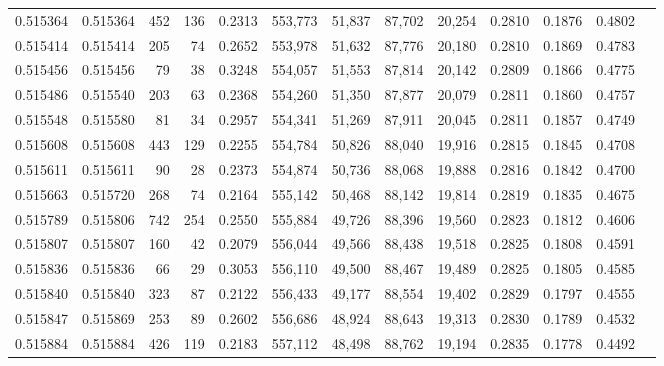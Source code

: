 \begin{tabular}{rrrrrrrrrrrrr}
0.515364 & 0.515364 &   452 &   136 &                                     0.2313 & 553,773 &  51,837 &  87,702 &  20,254 & 0.2810 & 0.1876 & 0.4802 \\
0.515414 & 0.515414 &   205 &    74 &                                     0.2652 & 553,978 &  51,632 &  87,776 &  20,180 & 0.2810 & 0.1869 & 0.4783 \\
0.515456 & 0.515456 &    79 &    38 &                                     0.3248 & 554,057 &  51,553 &  87,814 &  20,142 & 0.2809 & 0.1866 & 0.4775 \\
0.515486 & 0.515540 &   203 &    63 &                                     0.2368 & 554,260 &  51,350 &  87,877 &  20,079 & 0.2811 & 0.1860 & 0.4757 \\
0.515548 & 0.515580 &    81 &    34 &                                     0.2957 & 554,341 &  51,269 &  87,911 &  20,045 & 0.2811 & 0.1857 & 0.4749 \\
0.515608 & 0.515608 &   443 &   129 &                                     0.2255 & 554,784 &  50,826 &  88,040 &  19,916 & 0.2815 & 0.1845 & 0.4708 \\
0.515611 & 0.515611 &    90 &    28 &                                     0.2373 & 554,874 &  50,736 &  88,068 &  19,888 & 0.2816 & 0.1842 & 0.4700 \\
0.515663 & 0.515720 &   268 &    74 &                                     0.2164 & 555,142 &  50,468 &  88,142 &  19,814 & 0.2819 & 0.1835 & 0.4675 \\
0.515789 & 0.515806 &   742 &   254 &                                     0.2550 & 555,884 &  49,726 &  88,396 &  19,560 & 0.2823 & 0.1812 & 0.4606 \\
0.515807 & 0.515807 &   160 &    42 &                                     0.2079 & 556,044 &  49,566 &  88,438 &  19,518 & 0.2825 & 0.1808 & 0.4591 \\
0.515836 & 0.515836 &    66 &    29 &                                     0.3053 & 556,110 &  49,500 &  88,467 &  19,489 & 0.2825 & 0.1805 & 0.4585 \\
0.515840 & 0.515840 &   323 &    87 &                                     0.2122 & 556,433 &  49,177 &  88,554 &  19,402 & 0.2829 & 0.1797 & 0.4555 \\
0.515847 & 0.515869 &   253 &    89 &                                     0.2602 & 556,686 &  48,924 &  88,643 &  19,313 & 0.2830 & 0.1789 & 0.4532 \\
0.515884 & 0.515884 &   426 &   119 &                                     0.2183 & 557,112 &  48,498 &  88,762 &  19,194 & 0.2835 & 0.1778 & 0.4492 \\

\end{tabular}
